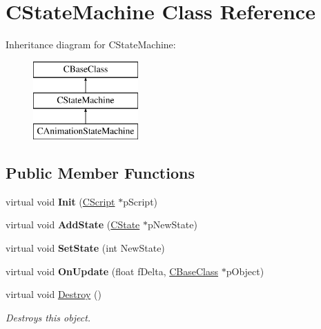 \hypertarget{class_c_state_machine}{}\section{C\+State\+Machine Class Reference}
\label{class_c_state_machine}
Inheritance diagram for C\+State\+Machine\+:\begin{figure}[H]
\begin{center}
\leavevmode
\includegraphics[height=3.000000cm]{class_c_state_machine}
\end{center}
\end{figure}
\subsection*{Public Member Functions}
\begin{DoxyCompactItemize}
\item 
virtual void {\bfseries Init} (\hyperlink{class_c_script}{C\+Script} $\ast$p\+Script)\hypertarget{class_c_state_machine_a8a622e89768e16100d17eb07a7d18eab}{}\label{class_c_state_machine_a8a622e89768e16100d17eb07a7d18eab}

\item 
virtual void {\bfseries Add\+State} (\hyperlink{class_c_state}{C\+State} $\ast$p\+New\+State)\hypertarget{class_c_state_machine_a921b1abfb513fb90c44339c9032d93ff}{}\label{class_c_state_machine_a921b1abfb513fb90c44339c9032d93ff}

\item 
virtual void {\bfseries Set\+State} (int New\+State)\hypertarget{class_c_state_machine_a014c7d7a0429fe69f37d8a7e84d5a490}{}\label{class_c_state_machine_a014c7d7a0429fe69f37d8a7e84d5a490}

\item 
virtual void {\bfseries On\+Update} (float f\+Delta, \hyperlink{class_c_base_class}{C\+Base\+Class} $\ast$p\+Object)\hypertarget{class_c_state_machine_aaba744da8fb67b364ad467bc7e475674}{}\label{class_c_state_machine_aaba744da8fb67b364ad467bc7e475674}

\item 
virtual void \hyperlink{class_c_state_machine_a27ef032baa2972e76e51cd2147671f68}{Destroy} ()\hypertarget{class_c_state_machine_a27ef032baa2972e76e51cd2147671f68}{}\label{class_c_state_machine_a27ef032baa2972e76e51cd2147671f68}

\begin{DoxyCompactList}\small\item\em Destroys this object. \end{DoxyCompactList}\end{DoxyCompactItemize}
